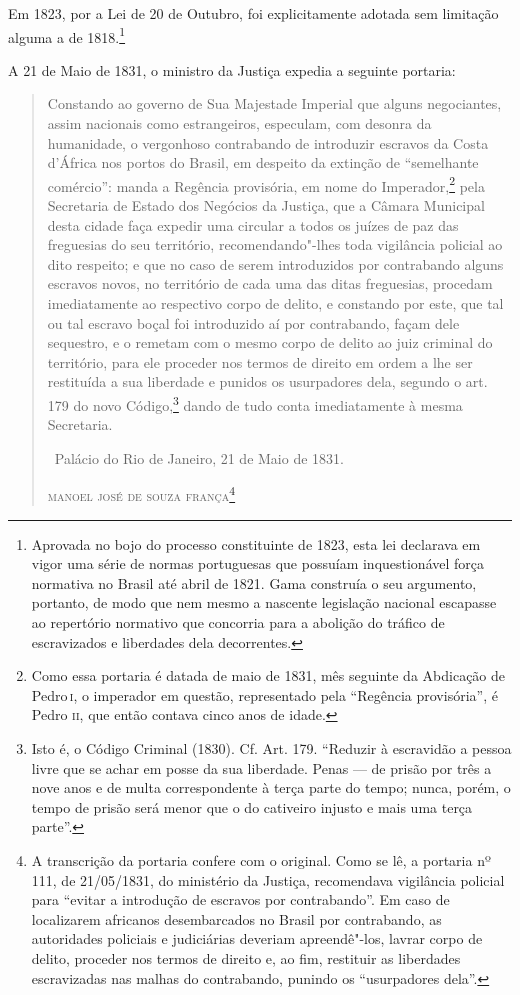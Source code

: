 Em 1823, por a Lei de 20 de Outubro, foi explicitamente adotada sem
limitação alguma a de 1818.\footnote{Aprovada no bojo do processo
  constituinte de 1823, esta lei declarava em vigor uma série de normas
  portuguesas que possuíam inquestionável força normativa no Brasil até
  abril de 1821. Gama construía o seu argumento, portanto, de modo que
  nem mesmo a nascente legislação nacional escapasse ao repertório
  normativo que concorria para a abolição do tráfico de escravizados e
  liberdades dela decorrentes.}

A 21 de Maio de 1831, o ministro da Justiça expedia a seguinte portaria:

\begin{quote}
Constando ao governo de Sua Majestade Imperial que alguns negociantes,
assim nacionais como estrangeiros, especulam, com desonra da humanidade,
o vergonhoso contrabando de introduzir escravos da Costa d'África nos
portos do Brasil, em despeito da extinção de ``semelhante comércio'':
manda a Regência provisória, em nome do Imperador,\footnote{Como essa
  portaria é datada de maio de 1831, mês seguinte da Abdicação de Pedro\,\textsc{i}, o imperador em questão, representado pela ``Regência provisória'', é
  Pedro \textsc{ii}, que então contava cinco anos de idade.} pela Secretaria de
Estado dos Negócios da Justiça, que a Câmara Municipal desta cidade faça
expedir uma circular a todos os juízes de paz das freguesias do seu
território, recomendando"-lhes toda vigilância policial ao dito respeito;
e que no caso de serem introduzidos por contrabando alguns escravos
novos, no território de cada uma das ditas freguesias, procedam
imediatamente ao respectivo corpo de delito, e constando por este, que
tal ou tal escravo boçal foi introduzido aí por contrabando, façam dele
sequestro, e o remetam com o mesmo corpo de delito ao juiz criminal do
território, para ele proceder nos termos de direito em ordem a lhe ser
restituída a sua liberdade e punidos os usurpadores dela, segundo o art.
179 do novo Código,\footnote{Isto é, o Código Criminal (1830). Cf. Art.
  179. ``Reduzir à escravidão a pessoa livre que se achar em posse da sua
  liberdade. Penas --- de prisão por três a nove anos e de multa
  correspondente à terça parte do tempo; nunca, porém, o tempo de prisão
  será menor que o do cativeiro injusto e mais uma terça parte''.} dando
de tudo conta imediatamente à mesma Secretaria.

\bigskip

\hfill\ Palácio do Rio de Janeiro, 21 de Maio de 1831.\smallskip

\hfill\textsc{manoel josé de souza frança}\footnote{A transcrição da portaria
  confere com o original. Como se lê, a portaria nº 111, de 21/05/1831,
  do ministério da Justiça, recomendava vigilância policial para ``evitar
  a introdução de escravos por contrabando''. Em caso de localizarem
  africanos desembarcados no Brasil por contrabando, as autoridades
  policiais e judiciárias deveriam apreendê"-los, lavrar corpo de
  delito, proceder nos termos de direito e, ao fim, restituir as
  liberdades escravizadas nas malhas do contrabando, punindo os
  ``usurpadores dela''.}
\end{quote}

